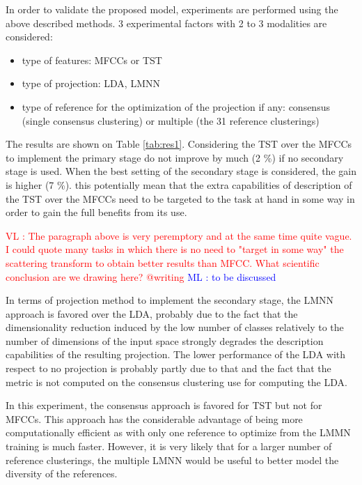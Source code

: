 \documentclass{article}
\newcommand{\ml}[1]{\textcolor{blue}{ML : #1}}
\newcommand{\vl}[1]{\textcolor{red}{VL : #1}}
\begin{document}
In order to validate the proposed model, experiments are performed using the above described methods. 3 experimental factors with 2 to 3 modalities are considered:
\begin{itemize}
  \item type of features: MFCCs or TST
  \item type of projection: LDA, LMNN
  \item type of reference for the optimization of the projection if any: consensus (single consensus clustering) or multiple (the 31 reference clusterings)
\end{itemize}
The results are shown on Table \ref{tab:res1}. Considering the TST over the MFCCs to implement the primary stage do not improve by much (2 \%) if no secondary stage is used. When the best setting of the secondary stage is considered, the gain is higher (7 \%). this potentially mean that the extra capabilities of description of the TST over the MFCCs need to be targeted to the task at hand in some way in order to gain the full benefits from its use.

\vl{The paragraph above is very peremptory and at the same time quite vague.
I could quote many tasks in which there is no need to "target in some way" the scattering transform to obtain better results than MFCC.
What scientific conclusion are we drawing here? @writing}
\ml{to be discussed}

In terms of projection method to implement the secondary stage, the LMNN approach is favored over the LDA, probably due to the fact that the dimensionality reduction induced by the low number of classes relatively to the number of dimensions of the input space strongly degrades the description capabilities of the resulting projection. The lower performance of the LDA with respect to no projection is probably partly due to that and the fact that the metric is not computed on the consensus clustering use for computing the LDA.

In this experiment, the consensus approach is favored for TST but not for MFCCs. This approach has the considerable advantage of being more computationally efficient as with only one reference to optimize from the LMMN training is much faster. However, it is very likely that for a larger number of reference clusterings, the multiple LMNN would be useful to better model the diversity of the references.
\end{document}

